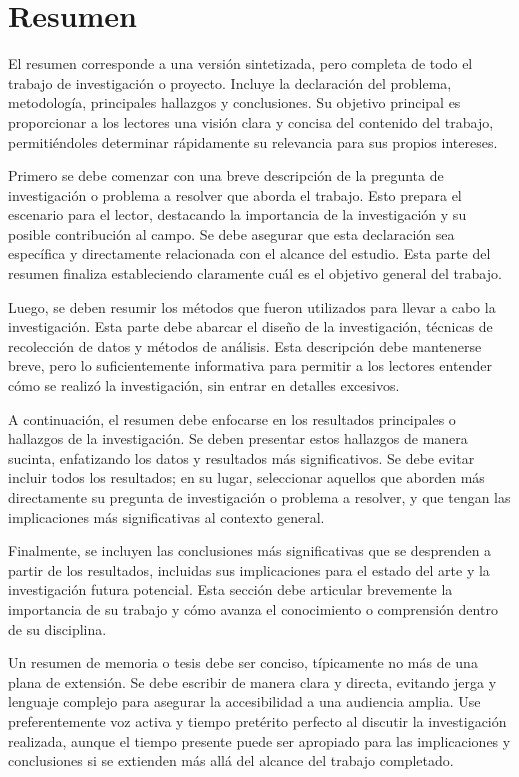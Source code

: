 \section*{Resumen}

El resumen corresponde a una versión sintetizada, pero completa de todo el trabajo de investigación o proyecto. Incluye la declaración del problema, metodología, principales hallazgos y conclusiones. Su objetivo principal es proporcionar a los lectores una visión clara y concisa del contenido del trabajo, permitiéndoles determinar rápidamente su relevancia para sus propios intereses.

Primero se debe comenzar con una breve descripción de la pregunta de investigación o problema a resolver que aborda el trabajo. Esto prepara el escenario para el lector, destacando la importancia de la investigación y su posible contribución al campo. Se debe asegurar que esta declaración sea específica y directamente relacionada con el alcance del estudio. Esta parte del resumen finaliza estableciendo claramente cuál es el objetivo general del trabajo.

Luego, se deben resumir los métodos que fueron utilizados para llevar a cabo la investigación. Esta parte debe abarcar el diseño de la investigación, técnicas de recolección de datos y métodos de análisis. Esta descripción debe mantenerse breve, pero lo suficientemente informativa para permitir a los lectores entender cómo se realizó la investigación, sin entrar en detalles excesivos.

A continuación, el resumen debe enfocarse en los resultados principales o hallazgos de la investigación. Se deben presentar estos hallazgos de manera sucinta, enfatizando los datos y resultados más significativos. Se debe evitar incluir todos los resultados; en su lugar, seleccionar aquellos que aborden más directamente su pregunta de investigación o problema a resolver, y que tengan las implicaciones más significativas al contexto general.

Finalmente, se incluyen las conclusiones más significativas que se desprenden a partir de los resultados, incluidas sus implicaciones para el estado del arte y la investigación futura potencial. Esta sección debe articular brevemente la importancia de su trabajo y cómo avanza el conocimiento o comprensión dentro de su disciplina.

Un resumen de memoria o tesis debe ser conciso, típicamente no más de una plana de extensión. Se debe escribir de manera clara y directa, evitando jerga y lenguaje complejo para asegurar la accesibilidad a una audiencia amplia. Use preferentemente voz activa y tiempo pretérito perfecto al discutir la investigación realizada, aunque el tiempo presente puede ser apropiado para las implicaciones y conclusiones si se extienden más allá del alcance del trabajo completado.



